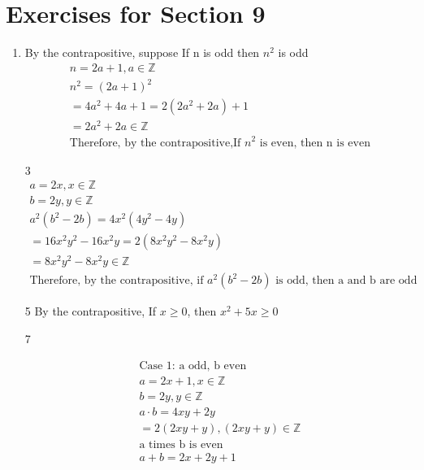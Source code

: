 \documentclass[12pt]{article}
\begin{document}
\section*{Exercises for Section 9}
\begin{enumerate}
    \item By the contrapositive, suppose If n is odd then $n^2$ is odd
	\begin{equation*}
	    \begin{split}
	    n = 2a + 1, a \in \mathbb{Z}\\
	    n^2 = (2a + 1)^2\\
	    = 4a^2 + 4a + 1 = 2(2a^2 + 2a) + 1\\
	    = 2a^2 + 2a \in \mathbb{Z}\\
	    \text{Therefore, by the contrapositive,If $n^2$ is even, then n is even}
	    \end{split}
	\end{equation*}
	\item [3]
	    \begin{equation*}
	    	\begin{split}
		    a = 2x, x \in \mathbb{Z}\\
		    b = 2y, y \in \mathbb{Z}\\
		    a^2(b^2 - 2b) = 4x^2(4y^2 - 4y)\\
		    = 16x^2y^2 - 16x^2y = 2(8x^2y^2 -8x^2y)\\
		    = 8x^2y^2 -8x^2y \in \mathbb{Z}\\
		    \text{Therefore, by the contrapositive, if $a^2(b^2 -2b)$ is odd, then a and b are odd}
	    	\end{split}
	    \end{equation*}
	\item [5] By the contrapositive, If $x \ge 0$, then $x^2 + 5x \ge 0$
	\item [7]
	    \begin{multicols}{2}
		\begin{equation*}
		\begin{split}
		\text{Case 1: a odd, b even}\\
		    a = 2x + 1, x \in \mathbb{Z}\\
		    b = 2y, y \in \mathbb{Z}\\
		    a\cdot b = 4xy + 2y\\
		    = 2(2xy + y), (2xy + y) \in \mathbb{Z}\\
		    \text{a times b is even}\\
		    a + b = 2x + 2y + 1\\

\end{split}
\end{equation*}
\end{multicols}
\end{enumerate}
\end{document}
